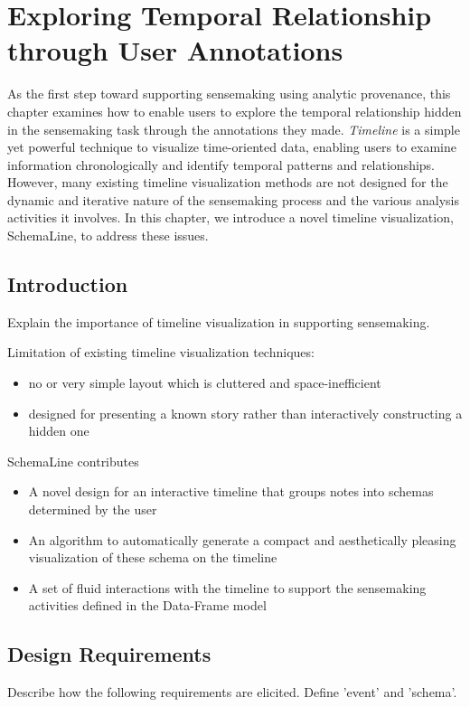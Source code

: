 \chapter{Exploring Temporal Relationship through User Annotations}
\label{chap:schemaline}

\graphicspath{{Chapter3/figures/}}
As the first step toward supporting sensemaking using analytic provenance, this chapter examines how to enable users to explore the temporal relationship hidden in the sensemaking task through the annotations they made. \emph{Timeline} is a simple yet powerful technique to visualize time-oriented data, enabling users to examine information chronologically and identify temporal patterns and relationships. However, many existing timeline visualization methods are not designed for the dynamic and iterative nature of the sensemaking process and the various analysis activities it involves. In this chapter, we introduce a novel timeline visualization, SchemaLine, to address these issues.

\section{Introduction}
Explain the importance of timeline visualization in supporting sensemaking.

Limitation of existing timeline visualization techniques:
\begin{itemize}
	\item no or very simple layout which is cluttered and space-inefficient
	\item designed for presenting a known story rather than interactively constructing a hidden one
\end{itemize}  

SchemaLine contributes
\begin{itemize}
	\item A novel design for an interactive timeline that groups notes into schemas determined by the user
	\item An algorithm to automatically generate a compact and aesthetically pleasing visualization of these schema on the timeline
	\item A set of fluid interactions with the timeline to support the sensemaking activities defined in the Data-Frame model
\end{itemize}

\section{Design Requirements}
Describe how the following requirements are elicited. Define 'event' and 'schema'.

